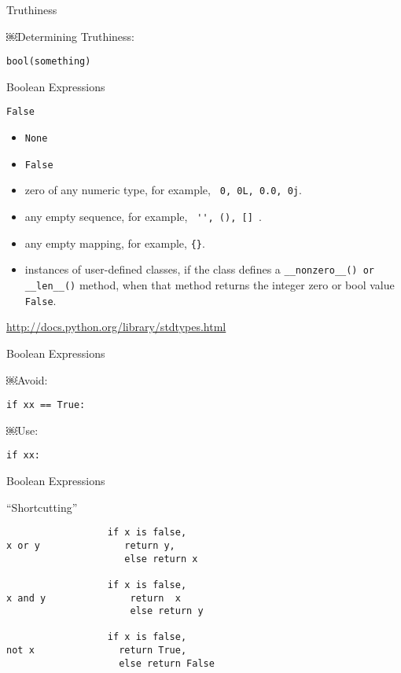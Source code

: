 \documentclass{beamer}
\begin{document}
\begin{frame}[fragile]{Truthiness}

{\Large ￼Determining Truthiness:}

\vfill
{\Large \verb+bool(something)+ }

\vfill


\end{frame}

\begin{frame}[fragile]{Boolean Expressions}

{\Large \verb+False+ }

\begin{itemize}
  \item \verb+None+
  \item \verb+False+
  \item zero of any numeric type, for example, \verb+ 0, 0L, 0.0, 0j+.
  \item any empty sequence, for example, \verb+ '', (), [] +.
  \item any empty mapping, for example, \verb+{}+.
  \item instances of user-defined classes, if the class defines a
        \verb+__nonzero__() or __len__()+ method, when that method
        returns the integer zero or bool value \verb+False+.
\end{itemize}

\url{http://docs.python.org/library/stdtypes.html}

\end{frame}

\begin{frame}[fragile]{Boolean Expressions}

{ \Large￼Avoid: }

\vspace{0.1in}
\verb+if xx == True:+

\vfill
{ \Large￼Use: }

\vspace{0.1in}
\verb+if xx:+

\vfill
\end{frame}

\begin{frame}[fragile]{Boolean Expressions}

{\Large ``Shortcutting''}

\begin{verbatim}
                  if x is false, 
x or y               return y,
                     else return x

                  if x is false,
x and y               return  x
                      else return y

                  if x is false,
not x               return True,
                    else return False 
\end{verbatim}

\end{frame} 
\end{document}
